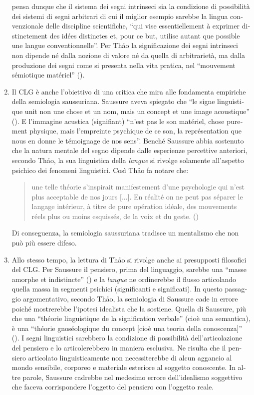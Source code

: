 \documentclass[italian,output=paper,colorlinks,citecolor=brown]{../langscibook}
\begin{document}
\begin{otherlanguage}{italian}
\begin{enumerate}
\citet[39]{Thao1974} pensa dunque che il sistema dei segni intrinseci sia la condizione di possibilità dei sistemi di segni arbitrari di cui il miglior esempio sarebbe la lingua convenzionale delle discipline scientifiche, “qui vise essentiellement à exprimer distinctement des idées distinctes et, pour ce but, utilise autant que possible une langue conventionnelle”. Per Th\textlatin{ả}o la significazione dei segni intrinseci non dipende né dalla nozione di valore né da quella di arbitrarietà, ma dalla produzione dei segni come si presenta nella vita pratica, nel “mouvement sémiotique matériel” (\citealt[39]{Thao1974}). 

\item Il CLG è anche l’obiettivo di una critica che mira alle fondamenta empiriche della semiologia saussuriana. Saussure aveva spiegato che “le signe linguistique unit non une chose et un nom, mais un concept et une image acoustique” (\citealt[98]{Saussure1995}). E l’immagine acustica (signifiant) “n’est pas le son matériel, chose purement physique, mais l’empreinte psychique de ce son, la représentation que nous en donne le témoignage de nos sens”. Benché Saussure abbia sostenuto che la natura mentale del segno dipende dalle esperienze percettive anteriori, secondo Th\textlatin{ả}o, la sua linguistica della \textit{langue} si rivolge solamente all’aspetto psichico dei fenomeni linguistici. Così Th\textlatin{ả}o fa notare che:

\begin{quote} 
    une telle théorie s’inspirait manifestement d’une psychologie qui n’est plus acceptable de nos jours [...]. En réalité on ne peut pas séparer le langage intérieur, à titre de pure opération idéale, des mouvements réels plus ou moins esquissés, de la voix et du geste. (\citealt[25--26]{Thao1975})
\end{quote}
Di conseguenza, la semiologia saussuriana tradisce un mentalismo che non può più essere difeso.


\item Allo stesso tempo, la lettura di Th\textlatin{ả}o si rivolge anche ai presupposti filosofici del CLG. Per Saussure il pensiero, prima del linguaggio, sarebbe una “masse amorphe et indistincte” (\citealt[155]{Saussure1995}) e la \textit{langue} ne ordinerebbe il flusso articolando quella massa in segmenti psichici (significanti e significati). In questo passaggio argomentativo, secondo Th\textlatin{ả}o, la semiologia di Saussure cade in errore poiché mostrerebbe l’ipotesi idealista che la sostiene. Quella di Saussure, più che una “théorie linguistique de la signification verbale” (cioè una semantica), è una “théorie gnoséologique du concept [cioè una teoria della conoscenza]” (\citealt[41]{Thao1974}). I segni linguistici sarebbero la condizione di possibilità dell’articolazione del pensiero e lo articolerebbero in maniera esclusiva. Ne risulta che il pensiero articolato linguisticamente non necessiterebbe di alcun aggancio al mondo sensibile, corporeo e materiale esteriore al soggetto conoscente. In altre parole, Saussure cadrebbe nel medesimo errore dell’idealismo soggettivo che faceva corrispondere l’oggetto del pensiero con l’oggetto reale.


\end{enumerate}
\end{otherlanguage}
\end{document}
